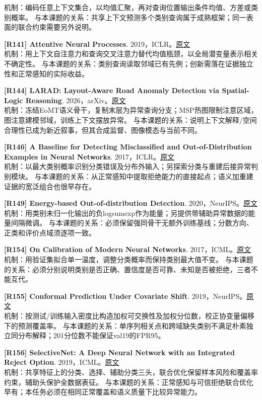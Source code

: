 \documentclass[11pt,a4paper]{article}
\begin{document}
机制：编码任意上下文集合，以均值汇聚，再对查询位置输出条件均值、方差或类别概率。 与本课题的关系：共享上下文预测多个类别查询属于成熟框架；同一表面的联合约束需要另外说明。\par\medskip
\hypertarget{R141}{}\textbf{[R141] Attentive Neural Processes}. 2019，ICLR。\href{https://arxiv.org/pdf/1901.05761v2}{原文}\\
机制：用上下文自注意力和查询交叉注意力替代均值瓶颈，以全局潜变量表示相关不确定性。 与本课题的关系：类别查询读取邻域已有先例；创新需落在证据独立性和正常感知的实际收益。\par\medskip
\hypertarget{R144}{}\textbf{[R144] LARAD: Layout-Aware Road Anomaly Detection via Spatial-Logic Reasoning}. 2026，arXiv。\href{https://arxiv.org/html/2607.12858}{原文}\\
机制：冻结EoMT语义骨干，复制末层为异常查询分支；MSP热图限制注意区域，图注意建模邻域，训练上下文摆放异常。 与本课题的关系：说明上下文解释/空间合理性已成为新近叙事，但其合成监督、图像模态与当前不同。\par\medskip
\hypertarget{R146}{}\textbf{[R146] A Baseline for Detecting Misclassified and Out-of-Distribution Examples in Neural Networks}. 2017，ICLR。\href{https://arxiv.org/pdf/1610.02136}{原文}\\
机制：以最大类别概率识别分类错误及分布外输入；另探索分类与重建后接异常判别模块。 与本课题的关系：从正常感知中提取拒绝能力的直接起点；语义加重建证据的宽泛组合也很早存在。\par\medskip
\hypertarget{R149}{}\textbf{[R149] Energy-based Out-of-distribution Detection}. 2020，NeurIPS。\href{https://arxiv.org/pdf/2010.03759}{原文}\\
机制：用类别未归一化输出的负logsumexp作为能量；另提供带辅助异常数据的能量间隔微调。 与本课题的关系：必须保留强同骨干无额外训练基线；分数方向、正类和评价点域须逐项一致。\par\medskip
\hypertarget{R154}{}\textbf{[R154] On Calibration of Modern Neural Networks}. 2017，ICML。\href{https://proceedings.mlr.press/v70/guo17a/guo17a.pdf}{原文}\\
机制：用验证集拟合单一温度，调整分类概率而保持类别最大值不变。 与本课题的关系：必须分别说明类别是否正确、置信度是否可靠、未知是否被拒绝，三者不能互代。\par\medskip
\hypertarget{R155}{}\textbf{[R155] Conformal Prediction Under Covariate Shift}. 2019，NeurIPS。\href{https://arxiv.org/pdf/1904.06019}{原文}\\
机制：按测试/训练输入密度比构造加权可交换性及加权分位数，校正协变量偏移下的预测覆盖率。 与本课题的关系：单序列相关点和跨域缺失类别不满足朴素独立同分布解释；201分位数不能保证val19的FPR95。\par\medskip
\hypertarget{R156}{}\textbf{[R156] SelectiveNet: A Deep Neural Network with an Integrated Reject Option}. 2019，ICML。\href{https://proceedings.mlr.press/v97/geifman19a/geifman19a.pdf}{原文}\\
机制：共享特征上的分类、选择、辅助分类三头，联合优化保留样本风险和覆盖率约束，辅助头保护全数据表征。 与本课题的关系：正常感知与可信拒绝联合优化早有；本任务必须在相同正常覆盖和语义质量下比较异常能力。\par\medskip
\endgroup
\end{document}
